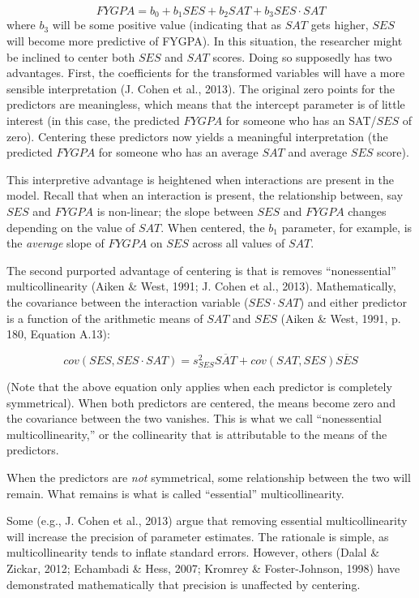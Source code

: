 \documentclass[english,man]{apa6}
\theoremstyle{definition}
\theoremstyle{definition}
\theoremstyle{remark}
\begin{document}
\[ FYGPA = b_0 + b_1SES + b_2SAT + b_3SES\cdot SAT \] where \(b_3\) will
be some positive value (indicating that as \(SAT\) gets higher, \(SES\)
will become more predictive of FYGPA). In this situation, the researcher
might be inclined to center both \(SES\) and \(SAT\) scores. Doing so
supposedly has two advantages. First, the coefficients for the
transformed variables will have a more sensible interpretation (J. Cohen
et al., 2013). The original zero points for the predictors are
meaningless, which means that the intercept parameter is of little
interest (in this case, the predicted \(FYGPA\) for someone who has an
SAT/\(SES\) of zero). Centering these predictors now yields a meaningful
interpretation (the predicted \(FYGPA\) for someone who has an average
\(SAT\) and average \(SES\) score).

This interpretive advantage is heightened when interactions are present
in the model. Recall that when an interaction is present, the
relationship between, say \(SES\) and \(FYGPA\) is non-linear; the slope
between \(SES\) and \(FYGPA\) changes depending on the value of \(SAT\).
When centered, the \(b_1\) parameter, for example, is the \emph{average}
slope of \(FYGPA\) on \(SES\) across all values of \(SAT\).

The second purported advantage of centering is that is removes
\enquote{nonessential} multicollinearity (Aiken \& West, 1991; J. Cohen
et al., 2013). Mathematically, the covariance between the interaction
variable (\(SES\cdot SAT\)) and either predictor is a function of the
arithmetic means of \(SAT\) and \(SES\) (Aiken \& West, 1991, p. 180,
Equation A.13):

\begin{equation}
cov(SES, SES\cdot SAT) = s^2_{SES} \overline{SAT} + cov(SAT, SES) \overline{SES}
\label{eq:correction}
\end{equation}

\noindent (Note that the above equation only applies when each predictor
is completely symmetrical). When both predictors are centered, the means
become zero and the covariance between the two vanishes. This is what we
call \enquote{nonessential multicollinearity,} or the collinearity that
is attributable to the means of the predictors.

When the predictors are \emph{not} symmetrical, some relationship
between the two will remain. What remains is what is called
\enquote{essential} multicollinearity.

Some (e.g., J. Cohen et al., 2013) argue that removing essential
multicollinearity will increase the precision of parameter estimates.
The rationale is simple, as multicollinearity tends to inflate standard
errors. However, others (Dalal \& Zickar, 2012; Echambadi \& Hess, 2007;
Kromrey \& Foster-Johnson, 1998) have demonstrated mathematically that
precision is unaffected by centering.
\end{document}
